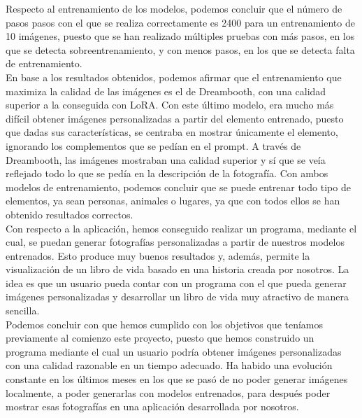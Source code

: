 Respecto al entrenamiento de los modelos, podemos concluir que el número de pasos pasos con el que se realiza correctamente es 2400 para un entrenamiento de 10 imágenes, puesto que se han realizado múltiples pruebas con más pasos, en los que se detecta sobreentrenamiento, y con menos pasos, en los que se detecta falta de entrenamiento.\\

En base a los resultados obtenidos, podemos afirmar que el entrenamiento que maximiza la calidad de las imágenes es el de Dreambooth, con una calidad superior a la conseguida con LoRA. Con este último modelo, era mucho más difícil obtener imágenes personalizadas a partir del elemento entrenado, puesto que dadas sus características, se centraba en mostrar únicamente el elemento, ignorando los complementos que se pedían en el prompt. A través de Dreambooth, las imágenes mostraban una calidad superior y sí que se veía reflejado todo lo que se pedía en la descripción de la fotografía. Con ambos modelos de entrenamiento, podemos concluir que se puede entrenar todo tipo de elementos, ya sean personas, animales o lugares, ya que con todos ellos se han obtenido resultados correctos.\\

Con respecto a la aplicación, hemos conseguido realizar un programa, mediante el cual, se puedan generar fotografías personalizadas a partir de nuestros modelos entrenados. Esto produce muy buenos resultados y, además, permite la visualización de un libro de vida basado en una historia creada por nosotros. La idea es que un usuario pueda contar con un programa con el que pueda generar imágenes personalizadas y desarrollar un libro de vida muy atractivo de manera sencilla.\\

Podemos concluir con que hemos cumplido con los objetivos que teníamos previamente al comienzo este proyecto, puesto que hemos construido un programa mediante el cual un usuario podría obtener imágenes personalizadas con una calidad razonable en un tiempo adecuado. Ha habido una evolución constante en los últimos meses en los que se pasó de no poder generar imágenes localmente, a poder generarlas con modelos entrenados, para después poder mostrar esas fotografías en una aplicación desarrollada por nosotros.


